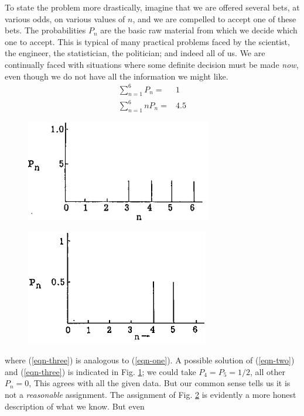 \documentclass[]{article}
\begin{document}
To state the problem more drastically, imagine that we are offered
several bets, at various odds, on various values of \(n\), and we are
compelled to accept one of these bets. The probabilities \(P_{n}\) are
the basic raw material from which we decide which one to accept. This is
typical of many practical problems faced by the scientist, the engineer,
the statistician, the politician; and indeed all of us. We are
continually faced with situations where some definite decision must be
made \emph{now}, even though we do not have all the information we might
like.
%
\begin{align}
\sum_{n = 1}^{6} P_{n} = & 1  \label{eqn-two} \\
\sum_{n = 1}^{6} nP_{n} = & 4.5 \label{eqn-three}
\end{align}
%
\begin{figure}
    \centering
    \includegraphics[width=3.20866in,height=1.75197in]{media/image1.jpeg}
    \caption{}
    \label{fig-one}
\end{figure}
%
\begin{figure}
    \centering
    \includegraphics[width=3.16142in,height=2in]{media/image2.png}
    \caption{}
    \label{fig-two}
\end{figure}
%
where (\ref{eqn-three}) is analogous to (\ref{eqn-one}). A possible solution of (\ref{eqn-two}) and (\ref{eqn-three}) is indicated
in Fig. \ref{fig-one}; we could take \(P_{4} = P_{5} = 1/2\), all other
\(P_{n} = 0\), This agrees with all the given data. But our common sense
tells us it is not a \emph{reasonable} assignment. The assignment of
Fig. \ref{fig-two} is evidently a more honest description of what we know. But even
\end{document}
